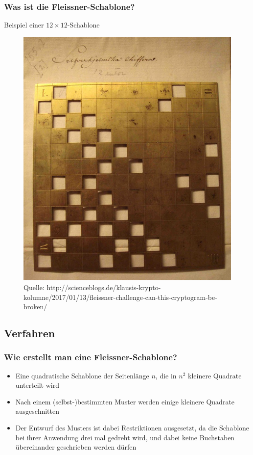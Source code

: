 \documentclass{beamer}
\begin{document}
\begin{frame} 
\frametitle{Was ist die Fleissner-Schablone?} 
Beispiel einer $12 \times 12$-Schablone
\begin{figure}
\includegraphics[scale=0.2]{Fleissner-Grille.jpg} 
\caption{\footnotesize Quelle: http://scienceblogs.de/klausis-krypto-kolumne/2017/01/13/fleissner-challenge-can-this-cryptogram-be-broken/}
\end{figure}
\end{frame}

\subsection{Verfahren}
\begin{frame} 
\frametitle{Wie erstellt man eine Fleissner-Schablone?} 
\begin{itemize}
\item Eine quadratische Schablone der Seitenlänge $n$, die in $n^2$ kleinere Quadrate
unterteilt wird%
\item Nach einem (selbst-)bestimmten Muster werden einige kleinere Quadrate ausgeschnitten%
\item Der Entwurf des Musters ist dabei Restriktionen ausgesetzt, da die Schablone bei ihrer Anwendung drei mal gedreht wird, und dabei keine Buchstaben übereinander geschrieben werden dürfen
\end{itemize}
\end{frame}
\end{document}
